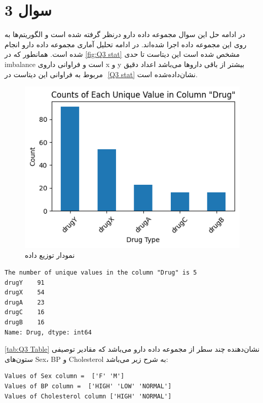 \documentclass{article}
\begin{document}
\section{سوال 3}

در ادامه حل این سوال مجموعه داده دارو درنظر گرفته شده است و الگوریتم‌ها به روی این مجموعه داده اجرا شده‌اند.
در ادامه تحلیل آماری مجموعه داده دارو انجام شده است. همانطور که در 
\autoref{fig:Q3 stat}
مشخص شده است این دیتاست تا حدی 
imbalance
است و فراوانی داروی x و y بیشتر از باقی داروها می‌باشد اعداد دقیق مربوط به فراوانی این دیتاست در ‎
\autoref{Q3 stat}
نشان‌داده‌شده است.
\begin{figure}[H]
\centering
\includegraphics[width=1\linewidth]{img/Q3/stat}
\caption{نمودار توزیع داده}
\label{fig:Q3 stat}
\end{figure}

\begin{LTR}
\label{Q3 stat}
\begin{verbatim}
The number of unique values in the column "Drug" is 5
drugY    91
drugX    54
drugA    23
drugC    16
drugB    16
Name: Drug, dtype: int64

\end{verbatim}
\end{LTR}

\autoref{tab:Q3 Table}
نشان‌دهنده چند سطر از مجموعه داده دارو می‌باشد که مقادیر توصیفی ستون‌های 
Sex، BP و Cholesterol 
به شرح زیر می‌باشد:
\begin{LTR}
\label{Q3 stat}
\begin{verbatim}
Values of Sex column =  ['F' 'M']
Values of BP column =  ['HIGH' 'LOW' 'NORMAL']
Values of Cholesterol column ['HIGH' 'NORMAL']
\end{verbatim}
\end{LTR}
\end{document}
